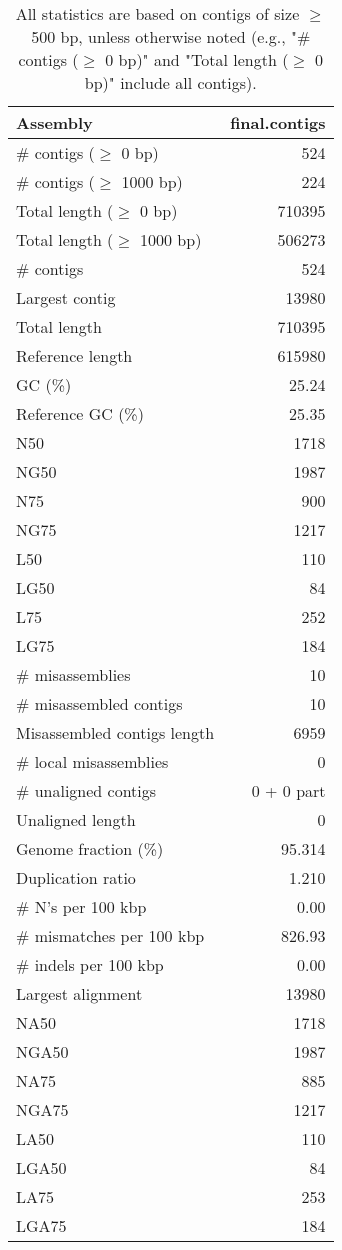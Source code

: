 \documentclass[12pt,a4paper]{article}
\begin{document}
\begin{table}[ht]
\begin{center}
\caption{All statistics are based on contigs of size $\geq$ 500 bp, unless otherwise noted (e.g., "\# contigs ($\geq$ 0 bp)" and "Total length ($\geq$ 0 bp)" include all contigs).}
\begin{tabular}{|l*{1}{|r}|}
\hline
Assembly & final.contigs \\ \hline
\# contigs ($\geq$ 0 bp) & 524 \\ \hline
\# contigs ($\geq$ 1000 bp) & 224 \\ \hline
Total length ($\geq$ 0 bp) & 710395 \\ \hline
Total length ($\geq$ 1000 bp) & 506273 \\ \hline
\# contigs & 524 \\ \hline
Largest contig & 13980 \\ \hline
Total length & 710395 \\ \hline
Reference length & 615980 \\ \hline
GC (\%) & 25.24 \\ \hline
Reference GC (\%) & 25.35 \\ \hline
N50 & 1718 \\ \hline
NG50 & 1987 \\ \hline
N75 & 900 \\ \hline
NG75 & 1217 \\ \hline
L50 & 110 \\ \hline
LG50 & 84 \\ \hline
L75 & 252 \\ \hline
LG75 & 184 \\ \hline
\# misassemblies & 10 \\ \hline
\# misassembled contigs & 10 \\ \hline
Misassembled contigs length & 6959 \\ \hline
\# local misassemblies & 0 \\ \hline
\# unaligned contigs & 0 + 0 part \\ \hline
Unaligned length & 0 \\ \hline
Genome fraction (\%) & 95.314 \\ \hline
Duplication ratio & 1.210 \\ \hline
\# N's per 100 kbp & 0.00 \\ \hline
\# mismatches per 100 kbp & 826.93 \\ \hline
\# indels per 100 kbp & 0.00 \\ \hline
Largest alignment & 13980 \\ \hline
NA50 & 1718 \\ \hline
NGA50 & 1987 \\ \hline
NA75 & 885 \\ \hline
NGA75 & 1217 \\ \hline
LA50 & 110 \\ \hline
LGA50 & 84 \\ \hline
LA75 & 253 \\ \hline
LGA75 & 184 \\ \hline
\end{tabular}
\end{center}
\end{table}
\end{document}
